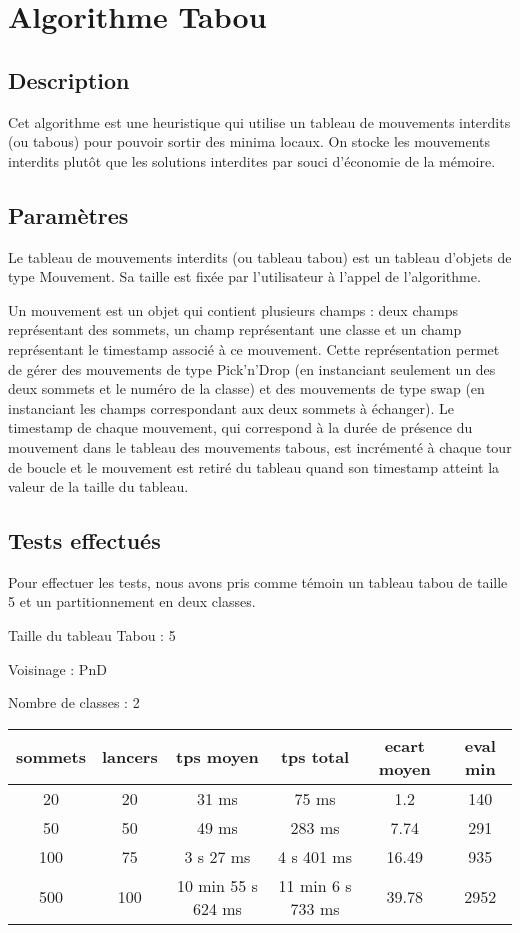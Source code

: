 \documentclass[12pt]{article}
\begin{document}
\newpage

\section{Algorithme Tabou}
\subsection{Description}
Cet algorithme est une heuristique qui utilise un tableau de mouvements interdits (ou tabous) pour pouvoir sortir des minima locaux. On stocke les mouvements interdits plutôt que les solutions interdites par souci d’économie de la mémoire.

\subsection{Paramètres}
Le tableau de mouvements interdits (ou tableau tabou) est un tableau d’objets de type Mouvement. Sa taille est fixée par l’utilisateur à l’appel de l’algorithme.

Un mouvement est un objet qui contient plusieurs champs : deux champs représentant des sommets, un champ représentant une classe et un champ représentant le timestamp associé à ce mouvement. Cette représentation permet de gérer des mouvements de type Pick’n’Drop (en instanciant seulement un des deux sommets et le numéro de la classe) et des mouvements de type swap (en instanciant les champs correspondant aux deux sommets à échanger).
Le timestamp de chaque mouvement, qui correspond à la durée de présence du mouvement dans le tableau des mouvements tabous, est incrémenté à chaque tour de boucle et le mouvement est retiré du tableau quand son timestamp atteint la valeur de la taille du tableau.

\subsection{Tests effectués}
Pour effectuer les tests, nous avons pris comme témoin un tableau tabou de taille 5 et un partitionnement en deux classes.

\bigskip

Taille du tableau Tabou : 5

Voisinage : PnD

Nombre de classes : 2
\bigskip

\begin{tabular}{|c|c|c|c|c|c|}
	\hline 
	sommets & lancers & tps moyen & tps total & ecart moyen & eval min\\
	\hline
	20 & 20 & 31 ms & 75 ms & 1.2 & 140 \\
	\hline
	 50 & 50 & 49 ms & 283 ms & 7.74 & 291 \\
	\hline
	 100 & 75 & 3 s 27 ms & 4 s 401 ms & 16.49 & 935 \\
	\hline
	 500 & 100 & 10 min 55 s 624 ms & 11 min 6 s 733 ms & 39.78 & 2952 \\
	\hline
\end{tabular}
\bigskip
\end{document}
